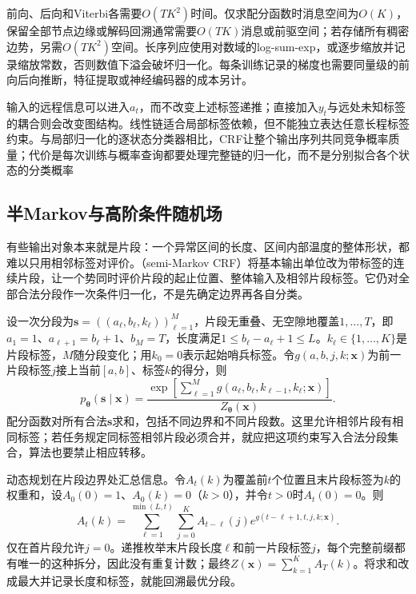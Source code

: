 前向、后向和Viterbi各需要$O(TK^2)$时间。仅求配分函数时消息空间为$O(K)$，保留全部节点边缘或解码回溯通常需要$O(TK)$消息或前驱空间；若存储所有稠密边势，另需$O(TK^2)$空间。长序列应使用对数域的log-sum-exp，或逐步缩放并记录缩放常数，否则数值下溢会破坏归一化。每条训练记录的梯度也需要同量级的前向后向推断，特征提取或神经编码器的成本另计。

输入的远程信息可以进入$a_t$，而不改变上述标签递推；直接加入$y_t$与远处未知标签的耦合则会改变图结构。线性链适合局部标签依赖，但不能独立表达任意长程标签约束。与局部归一化的逐状态分类器相比，CRF让整个输出序列共同竞争概率质量；代价是每次训练与概率查询都要处理完整链的归一化，而不是分别拟合各个状态的分类概率

\subsection{半Markov与高阶条件随机场}
\label{sec:pgm-energy-models-semi-higher}

有些输出对象本来就是片段：一个异常区间的长度、区间内部温度的整体形状，都难以只用相邻标签对评价。（semi-Markov CRF）将基本输出单位改为带标签的连续片段，让一个势同时评价片段的起止位置、整体输入及相邻片段标签。它仍对全部合法分段作一次条件归一化，不是先确定边界再各自分类。

设一次分段为$\bm{s}=((a_\ell,b_\ell,k_\ell))_{\ell=1}^M$，片段无重叠、无空隙地覆盖$1,\ldots,T$，即$a_1=1$、$a_{\ell+1}=b_\ell+1$、$b_M=T$，长度满足$1\leq b_\ell-a_\ell+1\leq L$。$k_\ell\in\{1,\ldots,K\}$是片段标签，$M$随分段变化；用$k_0=0$表示起始哨兵标签。令$g(a,b,j,k;\bm{x})$为前一片段标签$j$接上当前$[a,b]$、标签$k$的得分，则
\begin{equation}
  p_{\bm{\theta}}(\bm{s}\mid\bm{x})
   =\frac{\exp\!\left[
        \sum_{\ell=1}^M
          g(a_\ell,b_\ell,k_{\ell-1},k_\ell;\bm{x})
                    \right]}
          {Z_{\bm{\theta}}(\bm{x})}.
  \label{eq:pgm-energy-models-semi-distribution}
\end{equation}
配分函数对所有合法$\bm{s}$求和，包括不同边界和不同片段数。这里允许相邻片段有相同标签；若任务规定同标签相邻片段必须合并，就应把这项约束写入合法分段集合，算法也要禁止相应转移。

动态规划在片段边界处汇总信息。令$A_t(k)$为覆盖前$t$个位置且末片段标签为$k$的权重和，设$A_0(0)=1$、$A_0(k)=0$（$k>0$），并令$t>0$时$A_t(0)=0$。则
\begin{equation}
  A_t(k)=
    \sum_{\ell=1}^{\min(L,t)}\sum_{j=0}^K
       A_{t-\ell}(j)
       e^{g(t-\ell+1,t,j,k;\bm{x})}.
  \label{eq:pgm-energy-models-semi-forward}
\end{equation}
仅在首片段允许$j=0$。递推枚举末片段长度$\ell$和前一片段标签$j$，每个完整前缀都有唯一的这种拆分，因此没有重复计数；最终$Z(\bm{x})=\sum_{k=1}^KA_T(k)$。将求和改成最大并记录长度和标签，就能回溯最优分段。

